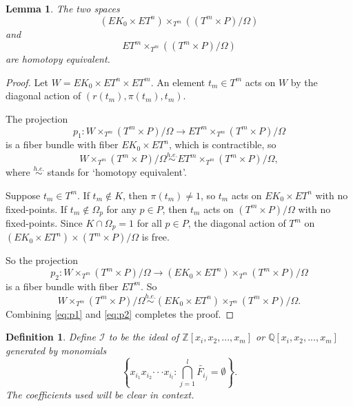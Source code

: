\documentclass[12pt]{amsart}
\def\Q {{\mathbb{Q}}}
\def\Z {{\mathbb{Z}}}
\def\I {{\mathcal{I}}}
\def\cdots {{\cdot\cdot\cdot}}
\newtheorem{lemma}[theorem]{Lemma}
\newtheorem{definition}[theorem]{Definition}
\theoremstyle{definition}
\numberwithin{equation}{section}
\begin{document}
\begin{lemma}\label{lemma:AG Property}
The two spaces
\begin{equation}
(EK_{0}\times ET^n)\times_{T^m}((T^m\times P)/\Omega)
\end{equation}
and
\begin{equation}
ET^m\times_{T^m}((T^m\times P)/\Omega)
\end{equation}
are homotopy equivalent.
\end{lemma}

\begin{proof}
Let $W= EK_{0}\times ET^n\times ET^m$. An element $t_{m}\in T^m$
acts on $W$ by the diagonal action of $(r(t_{m}), \pi(t_{m}),
t_{m})$.

The projection
\begin{equation}\label{eq:pp1}
p_{1}: W\times_{T^m}(T^m\times P)/\Omega \rightarrow
ET^m\times_{T^m}(T^m\times P)/\Omega
\end{equation} is a fiber
bundle with fiber $EK_{0}\times ET^n$, which is contractible, so
\begin{equation}\label{eq:p1}
W\times_{T^m}(T^m\times P)/\Omega\stackrel{h.e.}{\sim}
ET^m\times_{T^m}(T^m\times P)/\Omega , \end{equation} where
$\stackrel{h.e.}{\sim}$ stands for `homotopy equivalent'.

Suppose $t_{m}\in T^m$. If $t_{m}\not\in K$, then $\pi(t_{m})\neq
1$, so $t_{m}$ acts on $EK_{0}\times ET^n$ with no fixed-points. If
$t_{m}\not\in \Omega_{p}$ for any $p\in P$, then $t_{m}$ acts on
$(T^m\times P)/\Omega$ with no fixed-points.  Since $K\cap
\Omega_{p}=1$ for all $p\in P$, the diagonal action of $T^m$  on
$(EK_{0}\times ET^n)\times (T^m\times P)/\Omega$ is free.

So the projection
\begin{equation}\label{eq:pp2}
p_{2}: W\times_{T^m}(T^m\times P)/\Omega \rightarrow (EK_{0}\times
ET^n)\times_{T^m} (T^m\times P)/\Omega
\end{equation}
is a fiber bundle with fiber $ET^m$. So
\begin{equation}\label{eq:p2}
W\times_{T^m}(T^m\times P)/\Omega \stackrel{h.e.}{\sim}
(EK_{0}\times ET^n)\times_{T^m} (T^m\times P)/\Omega.
\end{equation}
Combining \eqref{eq:p1} and \eqref{eq:p2} completes the proof.
\end{proof}

\begin{definition}\label{def:I}
Define $\I$ to be the ideal of $\Z[x_{i},x_{2},...,x_{m}]$ or
$\Q[x_{i},x_{2},...,x_{m}]$ generated by monomials
\begin{equation*}\left\{x_{i_{1}}x_{i_{2}}\cdots x_{i_{l}}:
\bigcap_{j=1}^{l}\widetilde{F_{i_{j}}}=\emptyset\right\}.\end{equation*}
The coefficients used will be clear in context.
\end{definition}
\end{document}
